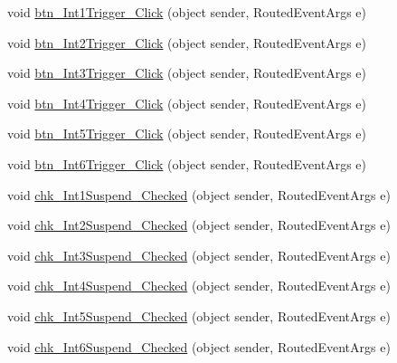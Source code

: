 \begin{DoxyCompactItemize}
\item 
void \hyperlink{class_c_p_u___o_s___simulator_1_1_interrupts_window_a0c580bf5510b962443e6ff1dac00a040}{btn\+\_\+\+Int1\+Trigger\+\_\+\+Click} (object sender, Routed\+Event\+Args e)
\item 
void \hyperlink{class_c_p_u___o_s___simulator_1_1_interrupts_window_a9b1d8e9beb9649695ea9353fa6323bc0}{btn\+\_\+\+Int2\+Trigger\+\_\+\+Click} (object sender, Routed\+Event\+Args e)
\item 
void \hyperlink{class_c_p_u___o_s___simulator_1_1_interrupts_window_a557db38bb2dcd11a3aaea502fa4312ef}{btn\+\_\+\+Int3\+Trigger\+\_\+\+Click} (object sender, Routed\+Event\+Args e)
\item 
void \hyperlink{class_c_p_u___o_s___simulator_1_1_interrupts_window_a63d67ae64452374041f8a8f3dab61056}{btn\+\_\+\+Int4\+Trigger\+\_\+\+Click} (object sender, Routed\+Event\+Args e)
\item 
void \hyperlink{class_c_p_u___o_s___simulator_1_1_interrupts_window_a4f51c83d5bd72b8723067398923b1005}{btn\+\_\+\+Int5\+Trigger\+\_\+\+Click} (object sender, Routed\+Event\+Args e)
\item 
void \hyperlink{class_c_p_u___o_s___simulator_1_1_interrupts_window_aee36fad3140c93638610f0f6ff66b2f0}{btn\+\_\+\+Int6\+Trigger\+\_\+\+Click} (object sender, Routed\+Event\+Args e)
\item 
void \hyperlink{class_c_p_u___o_s___simulator_1_1_interrupts_window_a4f7b589b450990dac188ad65a5a81437}{chk\+\_\+\+Int1\+Suspend\+\_\+\+Checked} (object sender, Routed\+Event\+Args e)
\item 
void \hyperlink{class_c_p_u___o_s___simulator_1_1_interrupts_window_a99d7d5ddfb07f1acf3f243571d0cb935}{chk\+\_\+\+Int2\+Suspend\+\_\+\+Checked} (object sender, Routed\+Event\+Args e)
\item 
void \hyperlink{class_c_p_u___o_s___simulator_1_1_interrupts_window_a8f828b8c0414fcd1394261575f454c97}{chk\+\_\+\+Int3\+Suspend\+\_\+\+Checked} (object sender, Routed\+Event\+Args e)
\item 
void \hyperlink{class_c_p_u___o_s___simulator_1_1_interrupts_window_a4a45ad5c7a298569610eb5eb6b7dc80c}{chk\+\_\+\+Int4\+Suspend\+\_\+\+Checked} (object sender, Routed\+Event\+Args e)
\item 
void \hyperlink{class_c_p_u___o_s___simulator_1_1_interrupts_window_a387ef7f0bc9446bce9822b12da2b42e3}{chk\+\_\+\+Int5\+Suspend\+\_\+\+Checked} (object sender, Routed\+Event\+Args e)
\item 
void \hyperlink{class_c_p_u___o_s___simulator_1_1_interrupts_window_a707cda27d14b3bbe8056bf953066a506}{chk\+\_\+\+Int6\+Suspend\+\_\+\+Checked} (object sender, Routed\+Event\+Args e)

\end{DoxyCompactItemize}
